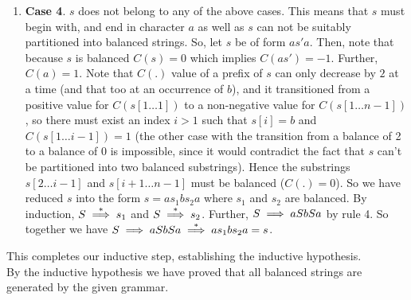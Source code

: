 \begin{soln}
\begin{enumerate}
    \item \textbf{Case 4}. $s$ does not belong to any of the above cases. This means that $s$ must begin with, and end in character $a$ as well as $s$ can not be suitably partitioned into balanced strings.
    So, let $s$ be of form $as'a$. Then, note that because $s$ is balanced $C(s) = 0$ which implies
    $C(as') = -1$. Further, $C(a) = 1$. Note that $C(.)$ value of a prefix of $s$ can only decrease by
    $2$ at a time (and that too at an occurrence of $b$), and it transitioned from a positive value for $C(s[1\ldots 1])$ to a non-negative value for $C(s[1\ldots n - 1])$, so there must exist an index $i > 1$ such that $s[i] = b$ and $C(s[1 \ldots i-1]) = 1$ (the other case with the transition from a balance of 2 to a balance of 0 is impossible, since it would contradict the fact that $s$ can't be partitioned into two balanced substrings).\nl
    Hence the substrings $s[2 \ldots i-1]$ and $s[i+1 \ldots n-1]$ must be balanced ($C(.) = 0$).
    So we have reduced $s$ into the form $s = a s_1 b s_2 a$ where $s_1$ and $s_2$ are balanced.
    By induction, $S \stackrel{*}{\implies} s_1$ and $S \stackrel{*}{\implies} s_2$. Further, $S \implies a S b S a$ by rule 4.
    So together we have $S \implies a S b S a \stackrel{*}{\implies} a s_1 b s_2 a = s$.
\end{enumerate}
This completes our inductive step, establishing the inductive hypothesis.\\

By the inductive hypothesis we have proved that all balanced strings are generated by the given grammar.
\end{soln}